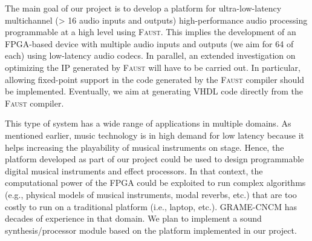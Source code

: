 \documentclass[a4paper,10pt]{article}
\newcommand{\F}{\textsc{Faust}}
\newcommand{\PP}{our project}
\begin{document}
The main goal of \PP{} is to develop a platform for ultra-low-latency multichannel (> 16 audio inputs and outputs) high-performance audio processing programmable at a high level using \F{}. This implies the development of an FPGA-based device with multiple audio inputs and outputs (we aim for 64 of each) using low-latency audio codecs. In parallel, an extended investigation on optimizing the IP generated by \F{} will have to be carried out. In particular, allowing fixed-point support in the code generated by the \F{} compiler should be implemented. Eventually, we aim at generating VHDL code directly from the \F{} compiler. %

This type of system has a wide range of applications in multiple domains. As mentioned earlier, music technology is in high demand for low latency because it helps increasing the playability of musical instruments on stage. Hence, the platform developed as part of \PP{} could be used to design programmable digital musical instruments and effect processors. In that context, the computational power of the FPGA could be exploited to run complex algorithms (e.g., physical models of musical instruments, modal reverbs, etc.) that are too costly to run on a traditional platform (i.e., laptop, etc.). GRAME-CNCM has decades of experience in that domain. We plan to implement a sound synthesis/processor module based on the platform implemented in \PP{}.
\end{document}
